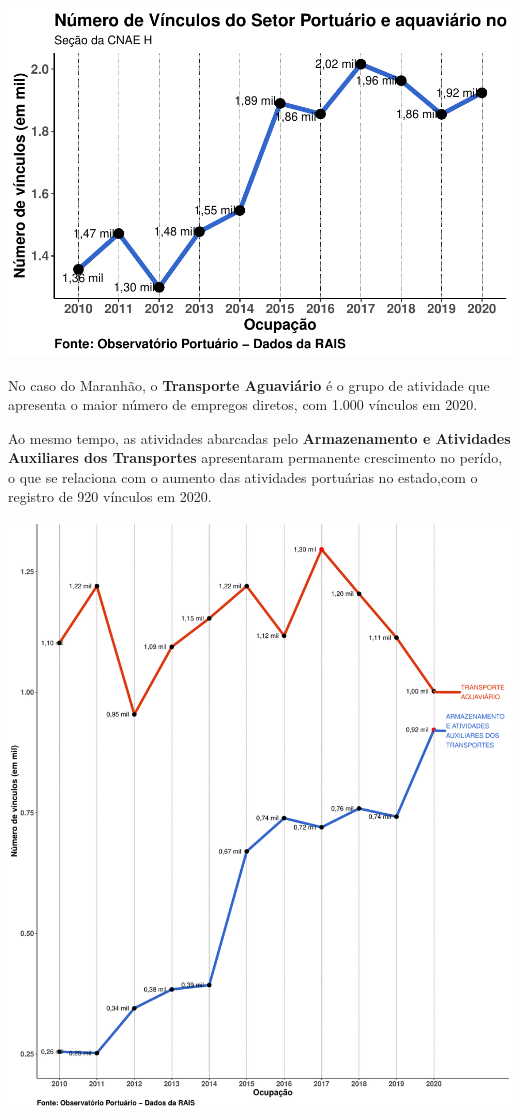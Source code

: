 \documentclass[
]{article}
\begin{document}
\includegraphics{mercado_trabalho_files/figure-latex/g_secao_ma-1.pdf}

No caso do Maranhão, o \textbf{Transporte Aguaviário} é o grupo de
atividade que apresenta o maior número de empregos diretos, com 1.000
vínculos em 2020.

Ao mesmo tempo, as atividades abarcadas pelo \textbf{Armazenamento e
Atividades Auxiliares dos Transportes} apresentaram permanente
crescimento no perído, o que se relaciona com o aumento das atividades
portuárias no estado,com o registro de 920 vínculos em 2020.

\includegraphics{mercado_trabalho_files/figure-latex/g_divisao_ma-1.pdf}
\end{document}
